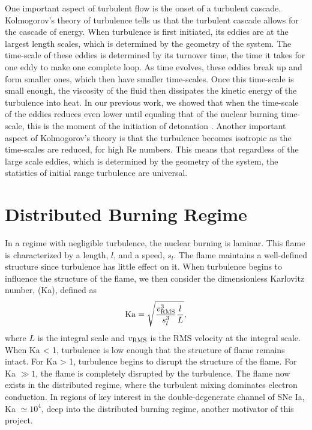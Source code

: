 \documentclass{aastex63}
\begin{document}
One important aspect of turbulent flow is the onset of a turbulent cascade. Kolmogorov's theory of turbulence tells us that the turbulent cascade allows for the cascade of energy. When turbulence is first initiated, its eddies are at the largest length scales, which is determined by the geometry of the system. The time-scale of these eddies is determined by its turnover time, the time it takes for one eddy to make one complete loop. As time evolves, these eddies break up and form smaller ones, which then have smaller time-scales. Once this time-scale is small enough, the viscosity of the fluid then dissipates the kinetic energy of the turbulence into heat. In our previous work, we showed that when the time-scale of the eddies reduces even lower until equaling that of the nuclear burning time-scale, this is the moment of the initiation of detonation \cite{Fisher}. Another important aspect of Kolmogorov's theory is that the turbulence becomes isotropic as the time-scales are reduced, for high Re numbers. This means that regardless of the large scale eddies, which is determined by the geometry of the system, the statistics of initial range turbulence are universal.

\section{Distributed Burning Regime}

In a regime with negligible turbulence, the nuclear burning is laminar. This flame is characterized by a length, $l$, and a speed, $s_l$. The flame maintains a well-defined structure since turbulence has little effect on it. When turbulence begins to influence the structure of the flame, we then consider the dimensionless Karlovitz number, (Ka), defined as
\begin{equation*}
        {\rm Ka} = \sqrt{\frac{v_{\rm RMS}^3}{s_l^3} \frac{l}{L}},
\end{equation*}
where $L$ is the integral scale and $v_{\rm RMS}$ is the RMS velocity at the integral scale. When Ka < 1, turbulence is low enough that the structure of flame remains intact. For Ka > 1, turbulence begins to disrupt the structure of the flame. For Ka $\gg 1$, the flame is completely disrupted by the turbulence. The flame now exists in the distributed regime, where the turbulent mixing dominates electron conduction. In regions of key interest in the double-degenerate channel of SNe Ia, Ka $\simeq 10^4$, deep into the distributed burning regime, another motivator of this project.
\end{document}

